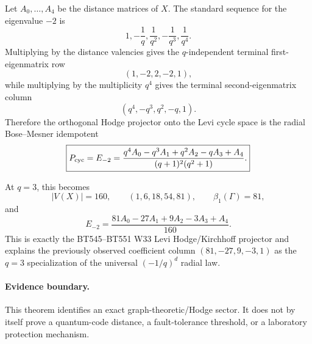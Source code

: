 Let \(A_0,\ldots,A_4\) be the distance matrices of \(X\).  The standard sequence for
the eigenvalue \(-2\) is
\[
1,-\frac1q,\frac1{q^2},-\frac1{q^3},\frac1{q^4}.
\]
Multiplying by the distance valencies gives the \(q\)-independent terminal first-eigenmatrix
row
\[
\boxed{(1,-2,2,-2,1),}
\]
while multiplying by the multiplicity \(q^4\) gives the terminal second-eigenmatrix column
\[
\boxed{(q^4,-q^3,q^2,-q,1).}
\]
Therefore the orthogonal Hodge projector onto the Levi cycle space is the radial Bose--Mesner
idempotent
\[
\boxed{
P_{\rm cyc}=E_{-2}
=
\frac{q^4A_0-q^3A_1+q^2A_2-qA_3+A_4}
{(q+1)^2(q^2+1)}.
}
\]

At \(q=3\), this becomes
\[
|V(X)|=160,
\qquad
(1,6,18,54,81),
\qquad
\beta_1(\Gamma)=81,
\]
and
\[
\boxed{
E_{-2}
=
\frac{81A_0-27A_1+9A_2-3A_3+A_4}{160}.
}
\]
This is exactly the BT545--BT551 W33 Levi Hodge/Kirchhoff projector and explains the
previously observed coefficient column \((81,-27,9,-3,1)\) as the \(q=3\) specialization
of the universal \((-1/q)^d\) radial law.

\paragraph{Evidence boundary.}
This theorem identifies an exact graph-theoretic/Hodge sector.  It does not by itself prove
a quantum-code distance, a fault-tolerance threshold, or a laboratory protection mechanism.
